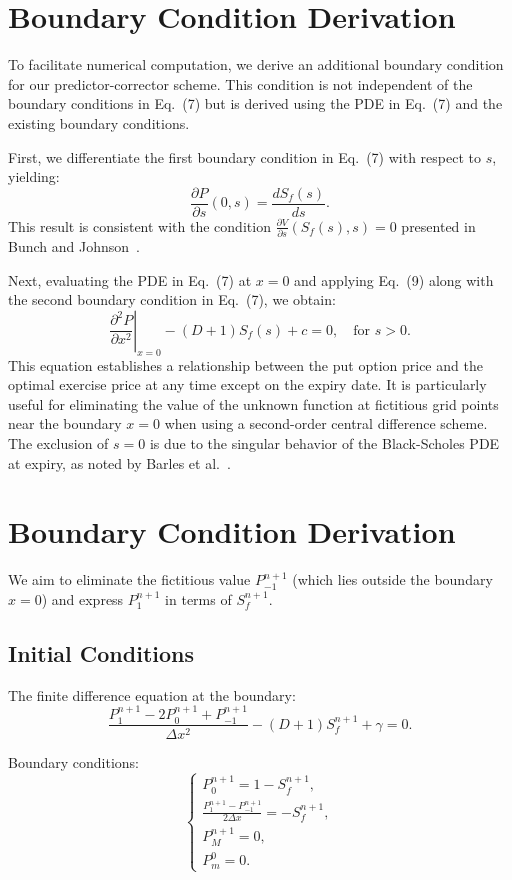 \documentclass{article}
\begin{document}
\section{Boundary Condition Derivation}

To facilitate numerical computation, we derive an additional boundary condition for our predictor-corrector scheme. This condition is not independent of the boundary conditions in Eq.~(7) but is derived using the PDE in Eq.~(7) and the existing boundary conditions. 

First, we differentiate the first boundary condition in Eq.~(7) with respect to $s$, yielding:
\[
\frac{\partial P}{\partial s}(0, s) = \frac{dS_f(s)}{ds}.
\]
This result is consistent with the condition $\frac{\partial V}{\partial s}(S_f(s), s) = 0$ presented in Bunch and Johnson~\cite{BunchJohnson}.

Next, evaluating the PDE in Eq.~(7) at $x = 0$ and applying Eq.~(9) along with the second boundary condition in Eq.~(7), we obtain:
\[
\left. \frac{\partial^2 P}{\partial x^2} \right|_{x=0} - (D + 1)S_f(s) + c = 0, \quad \text{for } s > 0.
\]
This equation establishes a relationship between the put option price and the optimal exercise price at any time except on the expiry date. It is particularly useful for eliminating the value of the unknown function at fictitious grid points near the boundary $x = 0$ when using a second-order central difference scheme. The exclusion of $s = 0$ is due to the singular behavior of the Black-Scholes PDE at expiry, as noted by Barles et al.~\cite{Barles}.
\section{Boundary Condition Derivation}

We aim to eliminate the fictitious value $P_{-1}^{n+1}$ (which lies outside the boundary $x=0$) and express $P_1^{n+1}$ in terms of $S_f^{n+1}$.

\subsection{Initial Conditions}
The finite difference equation at the boundary:
\begin{equation}
\frac{P_1^{n+1} - 2P_0^{n+1} + P_{-1}^{n+1}}{\Delta x^2} - (D + 1) S_f^{n+1} + \gamma = 0.
\end{equation}

Boundary conditions:
\begin{equation}
\left\{
\begin{array}{l}
P_0^{n+1} = 1 - S_f^{n+1}, \\
\frac{P_1^{n+1} - P_{-1}^{n+1}}{2\Delta x} = -S_f^{n+1}, \\
P_M^{n+1} = 0, \\
P_m^0 = 0.
\end{array}
\right.
\end{equation}
\end{document}
